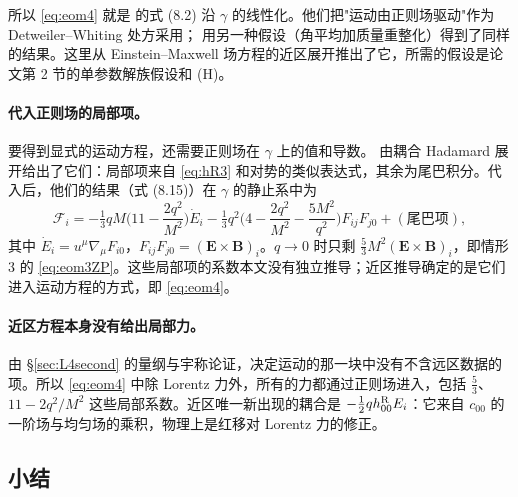\documentclass[11pt,a4paper]{ctexart}
\numberwithin{equation}{section}
\begin{document}
所以 \eqref{eq:eom4} 就是 \citet{ZimmermanPoisson2014} 的式 (8.2) 沿 $\gamma$ 的线性化。他们把"运动由正则场驱动"作为 Detweiler--Whiting 处方采用；\citet{LinzFriedmanWiseman2014b} 用另一种假设（角平均加质量重整化）得到了同样的结果。这里从 Einstein--Maxwell 场方程的近区展开推出了它，所需的假设是论文第 2 节的单参数解族假设和 (H)。

\paragraph{代入正则场的局部项。}要得到显式的运动方程，还需要正则场在 $\gamma$ 上的值和导数。\citet{ZimmermanPoisson2014} 由耦合 Hadamard 展开给出了它们：局部项来自 \eqref{eq:hR3} 和对势的类似表达式，其余为尾巴积分。代入后，他们的结果（式 (8.15)）在 $\gamma$ 的静止系中为
\begin{equation*}
\mathcal F_i=-\tfrac13qM\Big(11-\frac{2q^2}{M^2}\Big)\dot E_i-\tfrac13q^2\Big(4-\frac{2q^2}{M^2}-\frac{5M^2}{q^2}\Big)F_{ij}F_{j0}+(\text{尾巴项}),
\end{equation*}
其中 $\dot E_i=u^\mu\nabla_\mu F_{i0}$，$F_{ij}F_{j0}=(\boldsymbol E\times\boldsymbol B)_i$。$q\to0$ 时只剩 $\tfrac53M^2(\boldsymbol E\times\boldsymbol B)_i$，即情形 3 的 \eqref{eq:eom3ZP}。这些局部项的系数本文没有独立推导；近区推导确定的是它们进入运动方程的方式，即 \eqref{eq:eom4}。

\paragraph{近区方程本身没有给出局部力。}由 \S\ref{sec:L4second} 的量纲与宇称论证，决定运动的那一块中没有不含远区数据的项。所以 \eqref{eq:eom4} 中除 Lorentz 力外，所有的力都通过正则场进入，包括 $\tfrac53$、$11-2q^2/M^2$ 这些局部系数。近区唯一新出现的耦合是 $-\tfrac12qh^{\rm R}_{00}E_i$：它来自 $c_{00}$ 的一阶场与均匀场的乘积，物理上是红移对 Lorentz 力的修正。

\subsection{小结}
\end{document}
